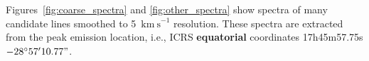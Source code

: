 \documentclass[]{aastex631}
\newcommand{\kms}{\ensuremath{\mathrm{km~s}^{-1}}\xspace}
\renewcommand{\deg}{\ensuremath{^{\circ}}\xspace}
\def\rr#1{\textbf{#1}}
\begin{document}
Figures~\ref{fig:coarse_spectra} and \ref{fig:other_spectra} show spectra of many candidate lines smoothed to 5~\kms resolution.
These spectra are extracted from the peak emission location, i.e., ICRS \rr{equatorial} coordinates 17h45m57.75s $-28\deg57'10.77"$.



\end{document}

